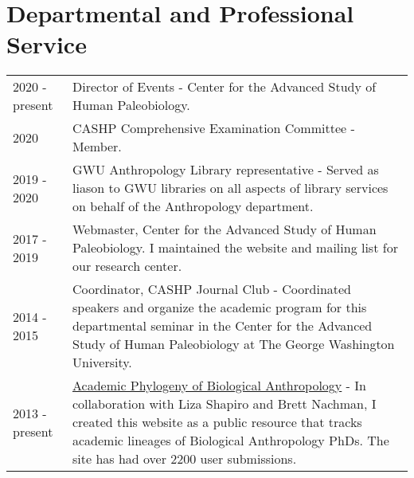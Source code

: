 \documentclass{article}
\begin{document}
\section*{Departmental and Professional Service}
\begin{longtable}{p{}p{}}
2020 - present & Director of Events - Center for the Advanced Study of Human Paleobiology.\\[4pt]
2020 & CASHP Comprehensive Examination Committee - Member.\\[4pt]
2019 - 2020 & GWU Anthropology Library representative - Served as liason to GWU libraries on all aspects of library services on behalf of the Anthropology department.\\[4pt]
2017 - 2019 & Webmaster, Center for the Advanced Study of Human Paleobiology. I maintained the website and mailing list for our research center.\\[4pt]
2014 - 2015 & Coordinator, CASHP Journal Club - Coordinated speakers and organize the academic program for this departmental seminar in the Center for the Advanced Study of Human Paleobiology at The George Washington University. \\[4pt]
2013 - present &  \href{https://bioanthtree.org}{Academic Phylogeny of Biological Anthropology} - In collaboration with Liza Shapiro and Brett Nachman, I created this website as a public resource that tracks academic lineages of Biological Anthropology PhDs. The site has had over 2200 user submissions.\\
\end{longtable}
\end{document}
